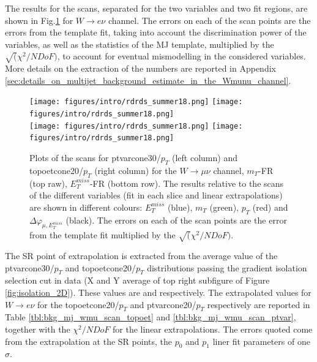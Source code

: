 The results for the scans, separated for the two variables and two fit regions, are shown in Fig.\ref{fig:mj_extrapolation_wmunu} for $W\rightarrow e\nu$ channel.
The errors on each of the scan points are the errors from the template fit, taking into account the discrimination power of the variables, as well as the statistics of the MJ template, multiplied by the $\sqrt(\chi^2/NDoF)$, to account for eventual mismodelling in the considered variables.
More details on the extraction of the numbers are reported in Appendix \ref{sec:details_on_multijet_background_estimate_in_the_Wmunu_channel}.

\begin{figure}[htbp]
\centering
\texttt{[image: figures/intro/rdrds\_summer18.png]}
\texttt{[image: figures/intro/rdrds\_summer18.png]}
\\
\texttt{[image: figures/intro/rdrds\_summer18.png]}
\texttt{[image: figures/intro/rdrds\_summer18.png]}
\caption{
 Plots of the scans for ptvarcone30/$p_T$ (left column) and topoetcone20/$p_T$ (right column) for the $W\rightarrow \mu\nu$ channel, $m_T$-FR (top raw), $E_T^{miss}$-FR (bottom row).
 The results relative to the scans of the different variables (fit in each slice and linear extrapolations) are shown in different colours: $E_T^{miss}$ (blue), $m_T$ (green), $p_T$ (red) and $\Delta\varphi_{\mu,E_T^{miss}}$ (black).
 The errors on each of the scan points are the error from the template fit multiplied by the $\sqrt(\chi^2/NDoF)$.
}
\label{fig:mj_extrapolation_wmunu}
\end{figure}

The SR point of extrapolation is extracted from the average value of the ptvarcone30/$p_T$ and topoetcone20/$p_T$ distributions passing the gradient isolation selection cut in data (X and Y average of top right subfigure of Figure \ref{fig:isolation_2D}).
These values are  and  respectively.
The extrapolated values for $W\rightarrow e\nu$ for the topoetcone20/$p_T$ and ptvarcone20/$p_T$ respectively are reported in Table \ref{tbl:bkg_mj_wmu_scan_topoet} and \ref{tbl:bkg_mj_wmu_scan_ptvar}, together with the $\chi^2/NDoF$ for the linear extrapolations.
The errors quoted come from the extrapolation at the SR points,  the $p_0$ and $p_1$ liner fit parameters of one $\sigma$.

